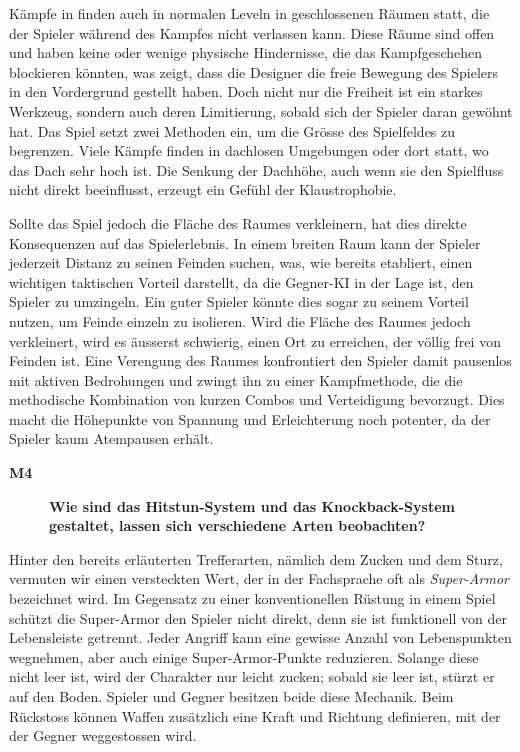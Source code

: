 \documentclass[../Main.tex]{subfiles}
\begin{document}
Kämpfe in  finden auch in normalen Leveln in geschlossenen Räumen statt, die der Spieler während des Kampfes nicht verlassen kann. Diese Räume sind offen und haben keine oder wenige physische Hindernisse, die das Kampfgeschehen blockieren könnten, was zeigt, dass die Designer die freie Bewegung des Spielers in den Vordergrund gestellt haben. Doch nicht nur die Freiheit ist ein starkes Werkzeug, sondern auch deren Limitierung, sobald sich der Spieler daran gewöhnt hat. Das Spiel setzt zwei Methoden ein, um die Grösse des Spielfeldes zu begrenzen. Viele Kämpfe finden in dachlosen Umgebungen oder dort statt, wo das Dach sehr hoch ist. Die Senkung der Dachhöhe, auch wenn sie den Spielfluss nicht direkt beeinflusst, erzeugt ein Gefühl der Klaustrophobie.

Sollte das Spiel jedoch die Fläche des Raumes verkleinern, hat dies direkte Konsequenzen auf das Spielerlebnis. In einem breiten Raum kann der Spieler jederzeit Distanz zu seinen Feinden suchen, was, wie bereits etabliert, einen wichtigen taktischen Vorteil darstellt, da die Gegner-KI in der Lage ist, den Spieler zu umzingeln. Ein guter Spieler könnte dies sogar zu seinem Vorteil nutzen, um Feinde einzeln zu isolieren. Wird die Fläche des Raumes jedoch verkleinert, wird es äusserst schwierig, einen Ort zu erreichen, der völlig frei von Feinden ist. Eine Verengung des Raumes konfrontiert den Spieler damit pausenlos mit aktiven Bedrohungen und zwingt ihn zu einer Kampfmethode, die die methodische Kombination von kurzen Combos und Verteidigung bevorzugt. Dies macht die Höhepunkte von Spannung und Erleichterung noch potenter, da der Spieler kaum Atempausen erhält.

\begin{description}
  \item[\textbf{M4}] \textbf{Wie sind das Hitstun-System und das Knockback-System gestaltet, lassen sich verschiedene Arten beobachten?}
\end{description}

Hinter den bereits erläuterten Trefferarten, nämlich dem Zucken und dem Sturz, vermuten wir einen versteckten Wert, der in der Fachsprache oft als \textit{Super-Armor} bezeichnet wird. Im Gegensatz zu einer konventionellen Rüstung in einem Spiel schützt die Super-Armor den Spieler nicht direkt, denn sie ist funktionell von der Lebensleiste getrennt. Jeder Angriff kann eine gewisse Anzahl von Lebenspunkten wegnehmen, aber auch einige Super-Armor-Punkte reduzieren. Solange diese nicht leer ist, wird der Charakter nur leicht zucken; sobald sie leer ist, stürzt er auf den Boden. Spieler und Gegner besitzen beide diese Mechanik. Beim Rückstoss können Waffen zusätzlich eine Kraft und Richtung definieren, mit der der Gegner weggestossen wird.
\end{document}
